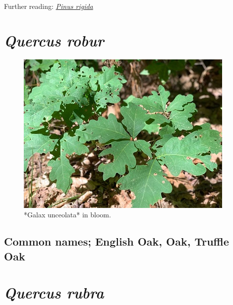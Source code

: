 \documentclass[
]{article}
\begin{document}
Further reading: \href{https://www.fs.fed.us/database/feis/plants/tree/pinrig/all.html\#Cone\%20survival\%20and\%20seedling\%20establishment:}{\emph{Pinus rigida}}

\hypertarget{quercus-robur}{%
\section{\texorpdfstring{\emph{Quercus robur}}{Quercus robur}}\label{quercus-robur}}

\begin{figure}

{\centering \includegraphics[width=0.5\linewidth]{english} 

}

\caption{*Galax unceolata* in bloom.}\label{fig:engoak}
\end{figure}

\hypertarget{common-names-english-oak-oak-truffle-oak}{%
\subsection{Common names; English Oak, Oak, Truffle Oak}\label{common-names-english-oak-oak-truffle-oak}}

\hypertarget{quercus-rubra}{%
\section{\texorpdfstring{\emph{Quercus rubra}}{Quercus rubra}}\label{quercus-rubra}}
\end{document}
